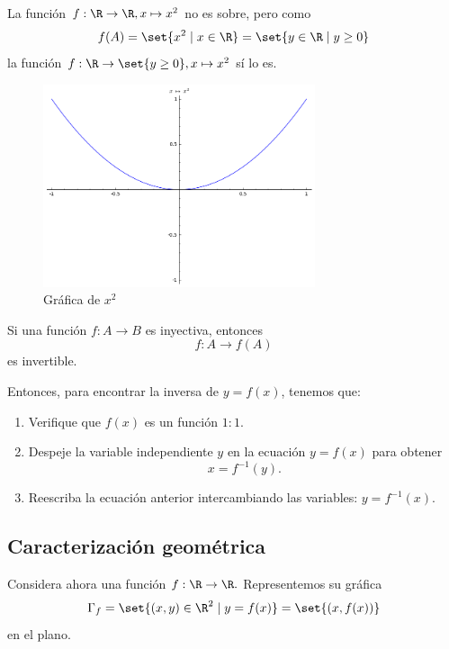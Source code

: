 \begin{ejemplo}
	La función $f:\R \to \R, x \mapsto x^{2}$ no es sobre, pero como 
	$$f(A)=\set{x^2\mid x\in\R}=\set{y\in \R \mid y\geq 0}$$
	la función $f: \R\to \set{y \geq 0}, x \mapsto x^{2}$ sí lo es.
\end{ejemplo}




\begin{figure}[h!]
	\centering
	\includegraphics[width=8cm,keepaspectratio=true]{./md/IMG-04_resticcion.png}
	\caption{Gráfica de $x^2$}
	\label{fig:0401}
\end{figure}




\begin{proposicion}
	Si una función $f:A \to B$ es inyectiva, entonces
	$$
	f:A \to f(A)
	$$ es invertible.
\end{proposicion}



Entonces, para encontrar la inversa de $y=f(x)$, tenemos que:
\begin{enumerate}
	\item Verifique que $f(x)$ es un función $1:1.$ 
	\item Despeje la variable independiente $y$ en la ecuación $y=f(x)$ para obtener
	$$x=f^{-1}(y).$$ 
	\item Reescriba la ecuación anterior intercambiando las variables: $y=f^{-1}(x).$
\end{enumerate}







%
\subsection{Caracterización geom\'etrica}


Considera ahora una función $f:\R \to \R.$ Representemos su gráfica 
$$
\Gamma_{f}=\set{(x,y)\in\R^{2}\mid y=f(x)}
=\set{(x,f(x))}
$$
en el plano.




